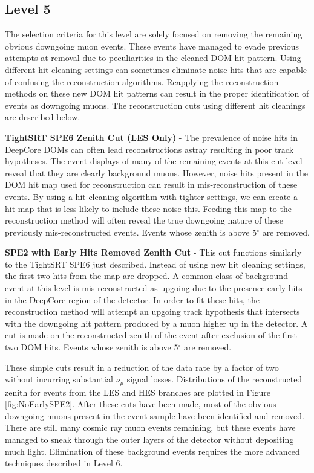 \documentclass{gatech-thesis}
\begin{document}
\subsection{Level 5}
The selection criteria for this level are solely focused on removing the remaining obvious downgoing muon events. These events have managed to evade previous attempts at removal due to peculiarities in the cleaned DOM hit pattern. Using different hit cleaning settings can sometimes eliminate noise hits that are capable of confusing the reconstruction algorithms. Reapplying the reconstruction methods on these new DOM hit patterns can result in the proper identification of events as downgoing muons. The reconstruction cuts using different hit cleanings are described below.
\begin{adjustwidth}{2.5em}{2.5em}
\setlength{\parindent}{0pt}
\textbf{TightSRT SPE6 Zenith Cut (LES Only)} - The prevalence of noise hits in DeepCore DOMs can often lead reconstructions astray resulting in poor track hypotheses. The event displays of many of the remaining events at this cut level reveal that they are clearly background muons. However, noise hits present in the DOM hit map used for reconstruction can result in mis-reconstruction of these events. By using a hit cleaning algorithm with tighter settings, we can create a hit map that is less likely to include these noise this. Feeding this map to the reconstruction method will often reveal the true downgoing nature of these previously mis-reconstructed events. Events whose zenith is above 5$^{\circ}$ are removed.

\textbf{SPE2 with Early Hits Removed Zenith Cut} - This cut functions similarly to the TightSRT SPE6 just described. Instead of using new hit cleaning settings, the first two hits from the map are dropped. A common class of background event at this level is mis-reconstructed as upgoing due to the presence early hits in the DeepCore region of the detector. In order to fit these hits, the reconstruction method will attempt an upgoing track hypothesis that intersects with the downgoing hit pattern produced by a muon higher up in the detector. A cut is made on the reconstructed zenith of the event after exclusion of the first two DOM hits. Events whose zenith is above 5$^{\circ}$ are removed.
\end{adjustwidth}
\setlength{\parindent}{17.5pt}
These simple cuts result in a reduction of the data rate by a factor of two without incurring substantial $\nu_{\mu}$ signal losses. Distributions of the reconstructed zenith for events from the LES and HES branches are plotted in Figure \ref{fig:NoEarlySPE2}. After these cuts have been made, most of the obvious downgoing muons present in the event sample have been identified and removed. There are still many cosmic ray muon events remaining, but these events have managed to sneak through the outer layers of the detector without depositing much light. Elimination of these background events requires the more advanced techniques described in Level 6.
\end{document}
